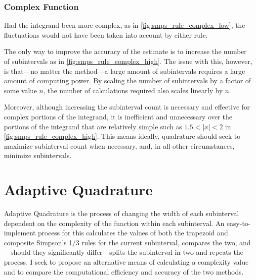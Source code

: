 \documentclass{paper}
\begin{document}
\subsubsection{Complex Function}
\label{sec:complex_examples}
Had the integrand been more complex, as in \cref{fig:smps_rule_complex_low}, the fluctuations would not have been taken into account by either rule.
%

%
The only way to improve the accuracy of the estimate is to increase the number of subintervals as in \cref{fig:smps_rule_complex_high}.
The issue with this, however, is that---no matter the method---a large amount of subintervals requires a large amount of computing power.
By scaling the number of subintervals by a factor of some value \(n\), the number of calculations required also scales linearly by \(n\).
%

%
Moreover, although increasing the subinterval count is necessary and effective for complex portions of the integrand, it is inefficient and unnecessary over the portions of the integrand that are relatively simple such as \(1.5 < |x| < 2\) in \cref{fig:smps_rule_complex_high}.
This means ideally, quadrature should seek to maximize subinterval count when necessary, and, in all other circumstances, minimize subintervals.

\section{Adaptive Quadrature}
\label{sec:adaptive}
Adaptive Quadrature is the process of changing the width of each subinterval dependent on the complexity of the function within each subinterval.
An easy-to-implement process for this calculates the values of both the trapezoid and composite Simpson's 1/3 rules for the current subinterval, compares the two, and---should they significantly differ---splits the subinterval in two and repeats the process.\autocite[p. 1]{established}
I seek to propose an alternative means of calculating a complexity value and to compare the computational efficiency and accuracy of the two methods.
\end{document}

